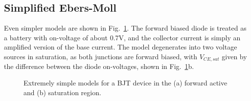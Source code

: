 \subsection{Simplified Ebers-Moll}
Even simpler models are shown in Fig.~\ref{fig:slide19}. The forward biased diode is treated as a battery with on-voltage of about 0.7V, and the collector current is simply an amplified version of the base current.  The model degenerates into two voltage sources in saturation, as both junctions are forward biased, with $V_{CE,sat}$ given by the difference between the diode on-voltages, shown in Fig.~\ref{fig:slide19}b.
\begin{figure}[tb]
\begin{center}
\end{center}
\caption{Extremely simple models for a BJT device in the (a) forward active and (b) saturation region.} \label{fig:slide19}
\end{figure} 
